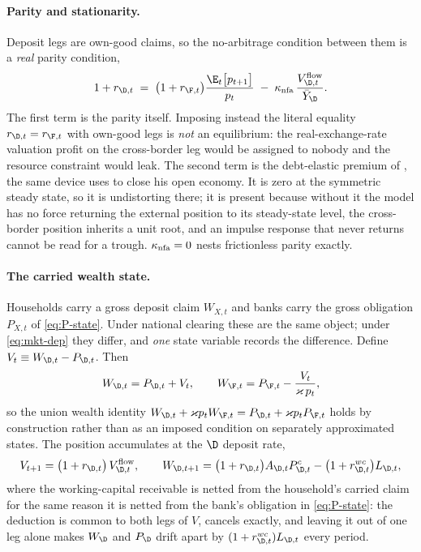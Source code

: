 \paragraph{Parity and stationarity.} Deposit legs are own-good claims, so the
no-arbitrage condition between them is a \emph{real} parity condition,
\begin{equation}
1+r_{\D,t}
\;=\;\bigl(1+r_{\F,t}\bigr)\frac{\E_t\bigl[p_{t+1}\bigr]}{p_t}
\;-\;\kappa_{\rm nfa}\,\frac{V^{\rm flow}_{\D,t}}{\bar Y_\D}.
\label{eq:uip}
\end{equation}
The first term is the parity itself. Imposing instead the literal equality
$r_{\D,t}=r_{\F,t}$ with own-good legs is \emph{not} an equilibrium: the
real-exchange-rate valuation profit on the cross-border leg would be assigned to
nobody and the resource constraint would leak. The second term is the
debt-elastic premium of \citet{schmittgrohe2003closing}, the same device
\citet{bocola2016pass} uses to close his open economy. It is zero at the
symmetric steady state, so it is undistorting there; it is present because
without it the model has no force returning the external position to its
steady-state level, the cross-border position inherits a unit root, and an
impulse response that never returns cannot be read for a trough.
$\kappa_{\rm nfa}=0$ nests frictionless parity exactly.

\paragraph{The carried wealth state.} Households carry a gross deposit claim
$W_{X,t}$ and banks carry the gross obligation $P_{X,t}$ of \eqref{eq:P-state}.
Under national clearing these are the same object; under \eqref{eq:mkt-dep} they
differ, and \emph{one} state variable records the difference. Define
$V_t\equiv W_{\D,t}-P_{\D,t}$. Then
\begin{equation}
W_{\D,t}=P_{\D,t}+V_t,
\qquad
W_{\F,t}=P_{\F,t}-\frac{V_t}{\varkappa\,p_t},
\label{eq:union-wealth}
\end{equation}
so the union wealth identity
$W_{\D,t}+\varkappa p_t W_{\F,t}=P_{\D,t}+\varkappa p_t P_{\F,t}$ holds by
construction rather than as an imposed condition on separately approximated
states. The position accumulates at the $\D$ deposit rate,
\begin{equation}
V_{t+1}=\bigl(1+r_{\D,t}\bigr)\,V^{\rm flow}_{\D,t},
\qquad
W_{\D,t+1}=\bigl(1+r_{\D,t}\bigr)A_{\D,t}P^{c}_{\D,t}
           -\bigl(1+r^{wc}_{\D,t}\bigr)L_{\D,t},
\label{eq:V-lom}
\end{equation}
where the working-capital receivable is netted from the household's carried claim
for the same reason it is netted from the bank's obligation in
\eqref{eq:P-state}: the deduction is common to both legs of $V$, cancels
exactly, and leaving it out of one leg alone makes $W_\D$ and $P_\D$ drift apart
by $(1+r^{wc}_{\D,t})L_{\D,t}$ every period.


